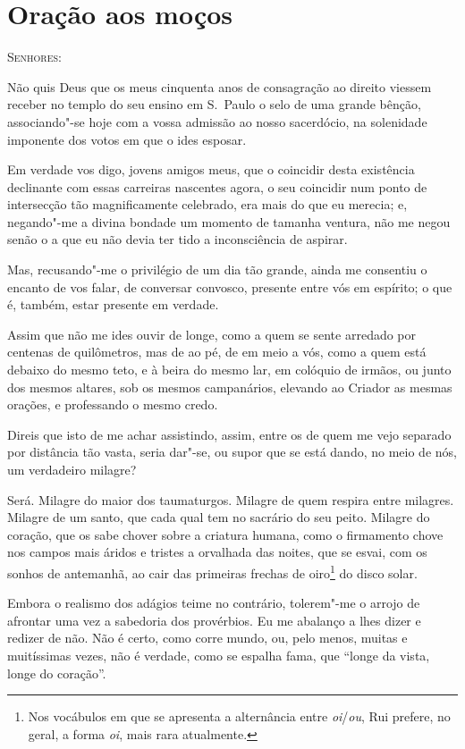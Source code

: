 \chapter*{Oração aos moços}

\textsc{Senhores:}

Não quis Deus que os meus cinquenta anos de consagração ao direito
viessem receber no templo do seu ensino
em S.~Paulo o selo de uma grande bênção, associando"-se hoje com a 
vossa admissão ao nosso sacerdócio, na solenidade imponente dos votos em que o ides esposar.

Em verdade vos digo, jovens amigos meus, que o coincidir desta
existência declinante com essas carreiras nascentes agora, o seu
coincidir num ponto de intersecção tão magnificamente celebrado, era
mais do que eu merecia; e, negando"-me a divina bondade um momento de
tamanha ventura, não me negou senão o a que eu não devia ter tido a
inconsciência de aspirar.

Mas, recusando"-me o privilégio de um dia tão grande, ainda me
consentiu o encanto de vos falar, de conversar convosco, presente entre
vós em espírito; o que é, também, estar presente em verdade.

Assim que não me ides ouvir de longe, como a quem se sente
arredado por centenas de quilômetros, mas de ao pé, de em meio a vós,
como a quem está debaixo do mesmo teto, e à beira do mesmo lar, em
colóquio de irmãos, ou junto dos mesmos altares, sob os mesmos
campanários, elevando ao Criador as mesmas orações, e professando o
mesmo credo.

Direis que isto de me achar assistindo, assim, entre os de quem me
vejo separado por distância tão vasta, seria dar"-se, ou supor que se
está dando, no meio de nós, um verdadeiro milagre?

Será. Milagre do maior dos taumaturgos. Milagre de quem respira
entre milagres. Milagre de um santo, que cada qual tem no sacrário do
seu peito. Milagre do coração, que os sabe chover sobre a criatura
humana, como o firmamento chove nos campos mais áridos e tristes a
orvalhada das noites, que se esvai, com os sonhos de antemanhã, ao cair
das primeiras frechas de oiro\footnote{Nos vocábulos em que se apresenta a
alternância entre \textit{oi}/\textit{ou}, Rui
prefere, no geral, a forma \textit{oi}, mais rara atualmente.} do disco solar.


Embora o realismo dos adágios teime no contrário, tolerem"-me o
arrojo de afrontar uma vez a sabedoria dos provérbios. Eu me abalanço a
lhes dizer e redizer de não. Não é certo, como corre mundo, ou, pelo
menos, muitas e muitíssimas vezes, não é verdade, como se espalha fama,
que ``longe da vista, longe do coração''.

